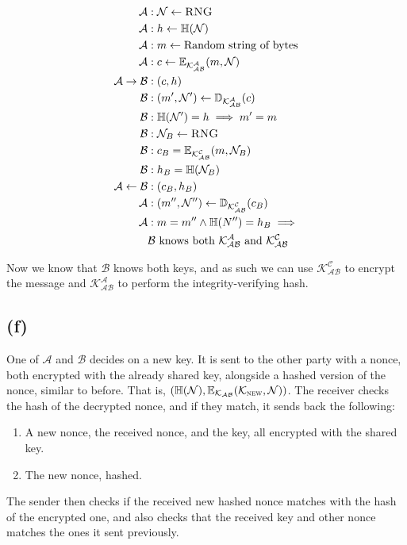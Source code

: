 \documentclass{article}
\begin{document}
\begin{align*}
    \mathcal A &: \mathcal{N} \leftarrow \textsc{RNG}
    \\
    \mathcal{A} &: h \leftarrow \mathbb{H}(\mathcal{N})
    \\
    \mathcal{A} &: m \leftarrow \text{Random string of bytes}
    \\
    \mathcal{A} &: c \leftarrow \mathbb{E}_\mathcal{K_{AB}^{A}}(m, \mathcal{N})
    \\
    \mathcal{A} \rightarrow \mathcal{B} &: (c, h)
    \\
    \mathcal{B} &: (m', \mathcal{N}') \leftarrow \mathbb{D}_\mathcal{K_{AB}^{A}}(c)
    \\
    \mathcal{B} &: \mathbb{H}(\mathcal{N}') = h \implies m' = m
    \\
    \mathcal{B} &: \mathcal{N}_B \leftarrow \textsc{RNG}
    \\
    \mathcal{B} &: c_B = \mathbb{E}_{\mathcal{K_ {AB}^C}}(m, \mathcal{N}_B)
    \\
    \mathcal{B} &: h_B = \mathbb{H}(\mathcal{N}_B)
    \\
    \mathcal{A} \leftarrow \mathcal{B} &: (c_B, h_B)
    \\
    \mathcal{A} &: (m'', \mathcal{N}'') \leftarrow \mathbb{D}_\mathcal{K_{AB}^{C}}(c_B)
    \\
    \mathcal{A} &: m = m'' \land \mathbb{H}(N'') = h_B \implies
    \\
    &\mathcal{B} \text{ knows both } \mathcal{K_{AB}^A} \text{ and } \mathcal{K_{AB}^C}
\end{align*}

\noindent Now we know that $\mathcal{B}$ knows both keys, and as such we can use $\mathcal{K_{AB}^C}$ to encrypt the message and $\mathcal{K_{AB}^A}$ to perform the integrity-verifying hash.

\subsection*{(f)}

One of $\mathcal A$ and $\mathcal B$ decides on a new key. 
It is sent to the other party with a nonce, both encrypted with the already shared key, alongside a hashed version of the nonce, similar to before. That is, $(\mathbb{H}(\mathcal{N}), \mathbb{E}_\mathcal{K_{AB}}(\mathcal{K}_{\textsc{new}}, \mathcal{N}))$.
The receiver checks the hash of the decrypted nonce, and if they match, it sends back the following:
\begin{enumerate}
    \item A new nonce, the received nonce, and the key, all encrypted with the shared key.
    \item The new nonce, hashed.
\end{enumerate}
The sender then checks if the received new hashed nonce matches with the hash of the encrypted one, and also checks that the received key and other nonce matches the ones it sent previously.
\end{document}
